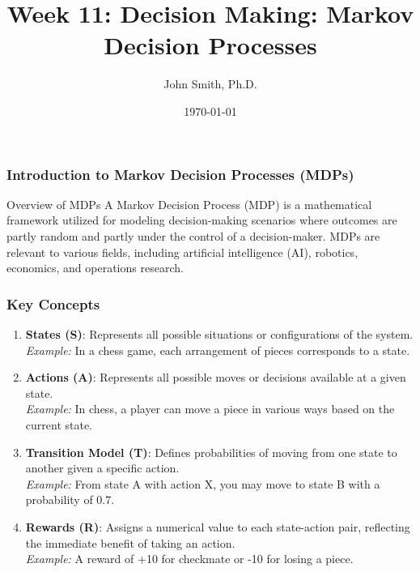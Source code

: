\documentclass[aspectratio=169]{beamer}
\title[Decision Making: MDPs]{Week 11: Decision Making: Markov Decision Processes}
\author[J. Smith]{John Smith, Ph.D.}
\institute[University Name]{
  Department of Computer Science\\
  University Name\\
  \vspace{0.3cm}
  Email: email@university.edu\\
  Website: www.university.edu
}
\date{\today}
\begin{document}
\frame{\titlepage}

\begin{frame}[fragile]
    \frametitle{Introduction to Markov Decision Processes (MDPs)}
    \begin{block}{Overview of MDPs}
        A Markov Decision Process (MDP) is a mathematical framework utilized for modeling decision-making scenarios where outcomes are partly random and partly under the control of a decision-maker. MDPs are relevant to various fields, including artificial intelligence (AI), robotics, economics, and operations research.
    \end{block}
\end{frame}

\begin{frame}[fragile]
    \frametitle{Key Concepts}
    \begin{enumerate}
        \item \textbf{States (S)}: Represents all possible situations or configurations of the system. \\
        \textit{Example:} In a chess game, each arrangement of pieces corresponds to a state.
        
        \item \textbf{Actions (A)}: Represents all possible moves or decisions available at a given state. \\
        \textit{Example:} In chess, a player can move a piece in various ways based on the current state.
        
        \item \textbf{Transition Model (T)}: Defines probabilities of moving from one state to another given a specific action. \\
        \textit{Example:} From state A with action X, you may move to state B with a probability of 0.7.
        
        \item \textbf{Rewards (R)}: Assigns a numerical value to each state-action pair, reflecting the immediate benefit of taking an action. \\
        \textit{Example:} A reward of +10 for checkmate or -10 for losing a piece.
    \end{enumerate}
\end{frame}
\end{document}
